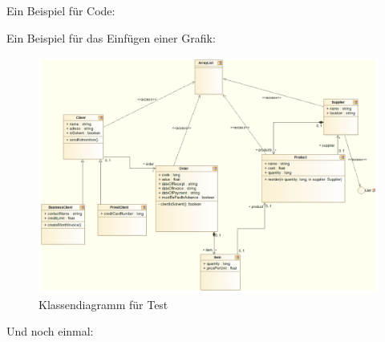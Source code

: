 Ein Beispiel für Code:

Ein Beispiel für das Einfügen einer Grafik:
\begin{figure}[H]
\centering
\includegraphics[width=0.7\linewidth]{Grafik/Diagramme/dummyClassDiagram}
\caption[Test-Klassendiagramm]{Klassendiagramm für Test}
\label{fig:dummyClassdiagram}
\end{figure}
Und noch einmal:
